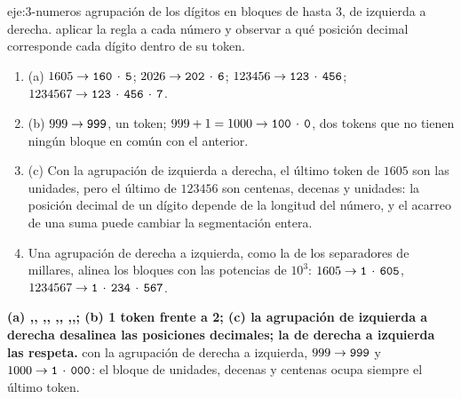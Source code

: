 \begin{solucion}{eje:3-numeros}
\datos agrupación de los dígitos en bloques de hasta 3, de izquierda a derecha.
\planteamiento aplicar la regla a cada número y observar a qué posición decimal corresponde cada dígito dentro de su token.
\pasos
\begin{enumerate}[label=\arabic*.]
  \item (a) $1605\to\texttt{160}\,\cdot{}\,\texttt{5}$; $2026\to\texttt{202}\,\cdot{}\,\texttt{6}$; $123456\to\texttt{123}\,\cdot{}\,\texttt{456}$; $1234567\to\texttt{123}\,\cdot{}\,\texttt{456}\,\cdot{}\,\texttt{7}$.
  \item (b) $999\to\texttt{999}$, un token; $999+1=1000\to\texttt{100}\,\cdot{}\,\texttt{0}$, dos tokens que no tienen ningún bloque en común con el anterior.
  \item (c) Con la agrupación de izquierda a derecha, el último token de $1605$ son las unidades, pero el último de $123456$ son centenas, decenas y unidades: la posición decimal de un dígito depende de la longitud del número, y el acarreo de una suma puede cambiar la segmentación entera.
  \item Una agrupación de derecha a izquierda, como la de los separadores de millares, alinea los bloques con las potencias de $10^{3}$: $1605\to\texttt{1}\,\cdot{}\,\texttt{605}$, $1234567\to\texttt{1}\,\cdot{}\,\texttt{234}\,\cdot{}\,\texttt{567}$.
\end{enumerate}
\resultado \textbf{(a) \sep{}, \sep{}, \sep{}, \sep{}\sep{}; (b) 1 token frente a 2; (c) la agrupación de izquierda a derecha desalinea las posiciones decimales; la de derecha a izquierda las respeta.}
\comprobacion con la agrupación de derecha a izquierda, $999\to\texttt{999}$ y $1000\to\texttt{1}\,\cdot{}\,\texttt{000}$: el bloque de unidades, decenas y centenas ocupa siempre el último token.
\end{solucion}

